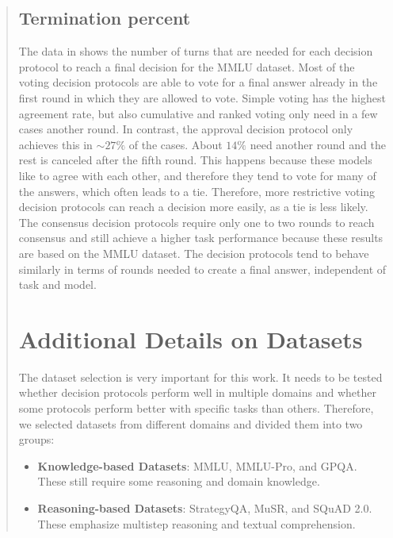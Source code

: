 \documentclass[11pt]{article}
\begin{document}
\begin{abstract}
\subsection{Termination percent}
\label{app:termination_percent}
The data in  shows the number of turns that are needed for each decision protocol to reach a final decision for the MMLU dataset. Most of the voting decision protocols are able to vote for a final answer already in the first round in which they are allowed to vote. Simple voting has the highest agreement rate, but also cumulative and ranked voting only need in a few cases another round. In contrast, the approval decision protocol only achieves this in $\sim27\%$ of the cases. About $14\%$ need another round and the rest is canceled after the fifth round. This happens because these models like to agree with each other, and therefore they tend to vote for many of the answers, which often leads to a tie. Therefore, more restrictive voting decision protocols can reach a decision more easily, as a tie is less likely. 
The consensus decision protocols require only one to two rounds to reach consensus and still achieve a higher task performance because these results are based on the MMLU dataset. The decision protocols tend to behave similarly in terms of rounds needed to create a final answer, independent of task and model.



\section{Additional Details on Datasets}
\label{appendix:datasets}

The dataset selection is very important for this work. It needs to be tested whether decision protocols perform well in multiple domains and whether some protocols perform better with specific tasks than others. Therefore, we selected datasets from different domains and divided them into two groups:

\begin{itemize}
    \item \textbf{Knowledge-based Datasets}: MMLU, MMLU-Pro, and GPQA. These still require some reasoning and domain knowledge.
    \item \textbf{Reasoning-based Datasets}: StrategyQA, MuSR, and SQuAD 2.0. These emphasize multistep reasoning and textual comprehension.
\end{itemize}


\end{abstract}
\end{document}
